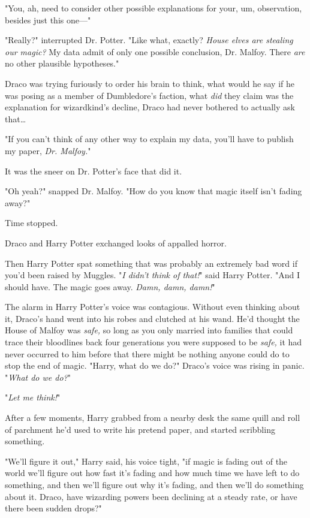 "You, ah, need to consider other possible explanations for your, um, 
observation, besides just this one---"

"Really?" interrupted Dr. Potter. "Like what, exactly? \emph{House elves are 
stealing our magic?} My data admit of only one possible conclusion, Dr. Malfoy. 
There \emph{are} no other plausible hypotheses."

Draco was trying furiously to order his brain to think, what would he say if he 
was posing as a member of Dumbledore's faction, what \emph{did} they claim was 
the explanation for wizardkind's decline, Draco had never bothered to actually 
ask that{\ldots}

"If you can't think of any other way to explain my data, you'll have to publish 
my paper, \emph{Dr. Malfoy.}"

It was the sneer on Dr. Potter's face that did it.

"Oh yeah?" snapped Dr. Malfoy. "How do you know that magic itself isn't fading 
away?"

Time stopped.

Draco and Harry Potter exchanged looks of appalled horror.

Then Harry Potter spat something that was probably an extremely bad word if 
you'd been raised by Muggles. "\emph{I didn't think of that!}" said Harry 
Potter. "And I should have. The magic goes away. \emph{Damn, damn, damn!}"

The alarm in Harry Potter's voice was contagious. Without even thinking about 
it, Draco's hand went into his robes and clutched at his wand. He'd thought the 
House of Malfoy was \emph{safe,} so long as you only married into families that 
could trace their bloodlines back four generations you were supposed to be 
\emph{safe,} it had never occurred to him before that there might be nothing 
anyone could do to stop the end of magic. "Harry, what do we do?" Draco's voice 
was rising in panic. "\emph{What do we do?}"

"\emph{Let me think!}"

After a few moments, Harry grabbed from a nearby desk the same quill and roll 
of parchment he'd used to write his pretend paper, and started scribbling 
something.

"We'll figure it out," Harry said, his voice tight, "if magic is fading out of 
the world we'll figure out how fast it's fading and how much time we have left 
to do something, and then we'll figure out why it's fading, and then we'll do 
something about it. Draco, have wizarding powers been declining at a steady 
rate, or have there been sudden drops?"

